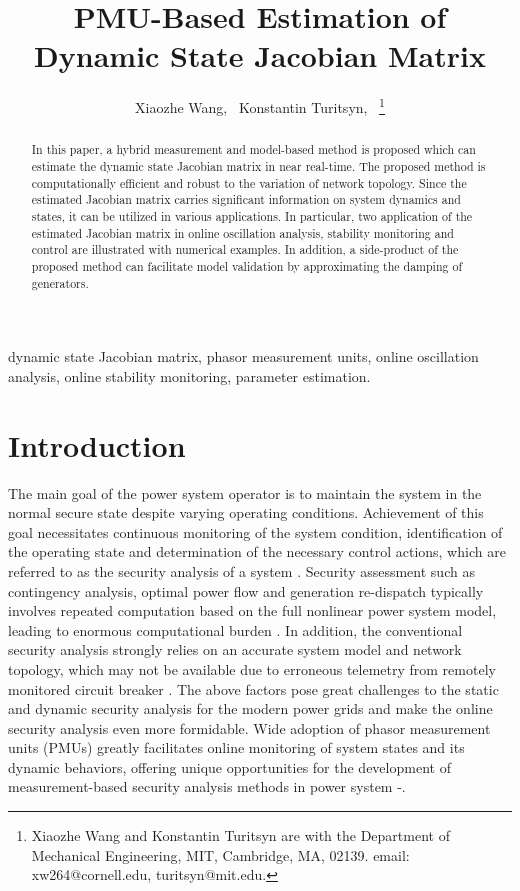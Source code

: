 \documentclass[journal]{IEEEtran}
\begin{document}
\title{PMU-Based Estimation of Dynamic State Jacobian Matrix}
\author{Xiaozhe Wang,~
        Konstantin Turitsyn,~
\thanks{Xiaozhe Wang and Konstantin Turitsyn are with the Department of Mechanical Engineering, MIT, Cambridge, MA, 02139. email: xw264@cornell.edu, turitsyn@mit.edu.}}


\maketitle


\begin{abstract}
In this paper, a hybrid measurement and model-based method is proposed which can estimate the dynamic state Jacobian matrix in near real-time. The proposed method is computationally efficient and robust to the variation of network topology. Since the estimated Jacobian matrix carries significant information on system dynamics and states, it can be utilized in various applications. In particular, two application of the estimated Jacobian matrix in online oscillation analysis, stability monitoring and control are illustrated with numerical examples. In addition, a side-product of the proposed method can facilitate model validation by approximating the damping of generators.
\end{abstract}

\begin{IEEEkeywords}
dynamic state Jacobian matrix, phasor measurement units, online oscillation analysis, online stability monitoring, parameter estimation.
\end{IEEEkeywords}

\IEEEpeerreviewmaketitle



\section{Introduction}
The main goal of the power system operator is to maintain the system in the normal secure state despite varying operating conditions. Achievement of this goal necessitates continuous monitoring of the system condition, identification of the operating state and determination of the necessary control actions, which are referred to as the security analysis of a system \cite{Abur:book}. Security assessment such as contingency analysis, optimal power flow and generation re-dispatch typically involves repeated computation based on the full nonlinear power system model, leading to enormous computational burden \cite{Chiang:book}. In addition, the conventional security analysis strongly relies on an accurate system model and network topology, which may not be available due to erroneous telemetry from remotely monitored circuit breaker \cite{Chen:2014}.
The above factors pose great challenges to the static and dynamic security analysis for the modern power grids and make the online security analysis even more formidable. Wide adoption of phasor measurement units (PMUs) greatly facilitates online monitoring of system states and its dynamic behaviors, offering unique opportunities for the development of measurement-based security analysis methods in power system \cite{Wangxz:2015}-\cite{Zhou:2009PES}.
\end{document}
